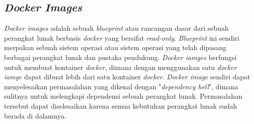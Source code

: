 	\subsection{\textit{Docker Images}}
	\textit{Docker images} adalah sebuah \textit{blueprint} atau rancangan dasar dari sebuah perangkat lunak berbasis \textit{docker} yang bersifat \textit{read-only}. \textit{Blueprint} ini sendiri merpakan sebuah sistem operasi atau sistem operasi yang telah dipasang berbagai perangkat lunak dan pustaka pendukung. \textit{Docker iamges} berfungsi untuk membuat kontainer \textit{docker}, dimana dengan menggunakan satu \textit{docker iamge} dapat dibuat lebih dari satu kontainer \textit{docker}. \textit{Docker image} sendiri dapat menyelesaikan permasalahan yang dikenal dengan "\textit{dependency hell}", dimana sulitnya untuk melengkapi dependensi sebuah perangkat lunak. Permasalahan tersebut dapat diselesaikan karena semua kebutuhan perangkat lunak sudah berada di dalamnya.
	
